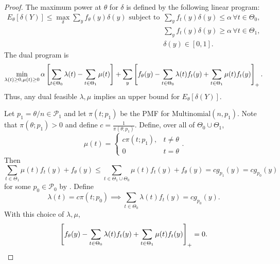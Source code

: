 \documentclass[12pt,reqno]{amsart}
\theoremstyle{theorem}
\theoremstyle{definition}
\newcommand{\0}{\mathbf{0}}
\newcommand{\1}{\mathbf{1}}
\begin{document}
\propunbiased*
\begin{proof}
    The maximum power at $\theta$ for $\delta$ is defined by the following linear program:
    \begin{align*}
    E_\theta[\delta(Y)] \le \max_{\delta} \sum_{y} f_\theta(y) \delta(y) \text{ subject to } 
    &\sum_y f_t(y) \delta(y) \le \alpha \, \forall t \in \Theta_0, \\
&\sum_y f_t(y) \delta(y) \ge \alpha \, \forall t \in \Theta_1, \\
&\delta(y) \in [0,1].
    \end{align*}
    The dual program is \[
        \min_{\lambda(t)\ge 0, \mu(t)\ge 0} \alpha\left[{\sum_{t\in\Theta_0} \lambda(t) - \sum_
        {t\in\Theta_1} \mu(t)}\right] + \sum_y \left[{
            f_{\theta}(y) - \sum_{t \in \Theta_0} \lambda(t) f_t(y) + \sum_{t\in \Theta_1}
            \mu(t) f_t(y)
        }\right]_+.
    \]
    Thus, any dual feasible $\lambda, \mu$ implies an upper bound for $E_\theta[\delta(Y)].$
    
    Let $p_1 = \theta /n \in \mathcal P_1$ and let $\pi(t; p_1)$ be the PMF for $
    \mathrm{Multinomial}(n,p_1)$. Note that $\pi(\theta; p_1) > 0$ and define $c =
    \frac{1}{\pi(\theta; p_1)}$. Define, over all of $\Theta_0 \cup \Theta_1$, \[
        \mu(t) = \begin{cases}
            c \pi(t;p_1), &t \neq \theta \\
0 & t = \theta           
        \end{cases}.
    \]
    Then \[
       \sum_{t\in \Theta_1} \mu(t) f_t(y) + f_\theta(y) \le \sum_{t\in
       \Theta_1\cup\Theta_0} \mu(t) f_t(y) + f_\theta(y) = c g_{p_1}(y) = c g_
        {p_0}(y)
    \]
    for some $p_0 \in \mathcal P_0$ by . Define \[
        \lambda(t) = c\pi(t; p_0) \implies \sum_{t \in \Theta_0} \lambda(t) f_t(y) = c g_
        {p_0}(y).
    \]
    With this choice of $\lambda, \mu$, \[
        \left[{
            f_{\theta}(y) - \sum_{t \in \Theta_0} \lambda(t) f_t(y) + \sum_{t\in \Theta_1}
            \mu(t) f_t(y)
        }\right]_+ = 0.
    \]


\end{proof}
\end{document}
